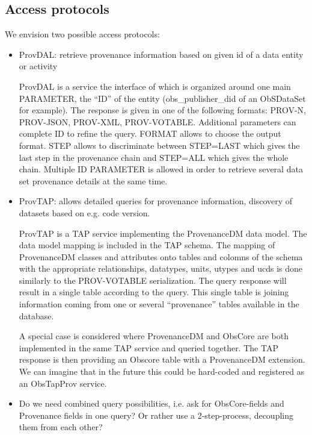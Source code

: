 \subsection{Access protocols}
\label{sec:access_protocols}
We envision two possible access protocols:
\begin{itemize}
\item ProvDAL: retrieve provenance information based on given id of a data entity or activity

ProvDAL is a service the interface of which is organized around one main PARAMETER, the ``ID'' of the entity (obs\_publisher\_did of an ObSDataSet for example). The response is given in one of the following formats: PROV-N, PROV-JSON, PROV-XML, PROV-VOTABLE. Additional parameters can complete ID to refine the query. FORMAT allows to choose the output format. STEP allows to discriminate between STEP=LAST which gives the last step in the provenance chain and STEP=ALL which gives the whole chain.
Multiple ID PARAMETER is allowed in order to retrieve several data set provenance details at the same time.
\item ProvTAP: allows detailed queries for provenance information, discovery of datasets based on 
e.g. code version.

ProvTAP is a TAP service implementing the ProvenanceDM data model. The data model mapping is included in the TAP schema. The mapping of ProvenanceDM classes and attributes onto tables and colomns of the schema with the appropriate relationships, datatypes, units, utypes and ucds is done similarly to the PROV-VOTABLE serialization. The query response will result in a single table according to the query.
 This  single table is joining information coming from one or several ``provenance'' tables available in the database. 

A special case is considered where ProvenanceDM and ObsCore are both implemented in the same TAP service and queried together. The TAP response is then providing an Obscore table with a ProvenanceDM extension. We can imagine that in the future this could be hard-coded and registered as an ObsTapProv service. 


\item Do we need combined query possibilities, i.e. ask for ObsCore-fields and Provenance fields
in one query? Or rather use a 2-step-process, decoupling them from each other?
\end{itemize}


